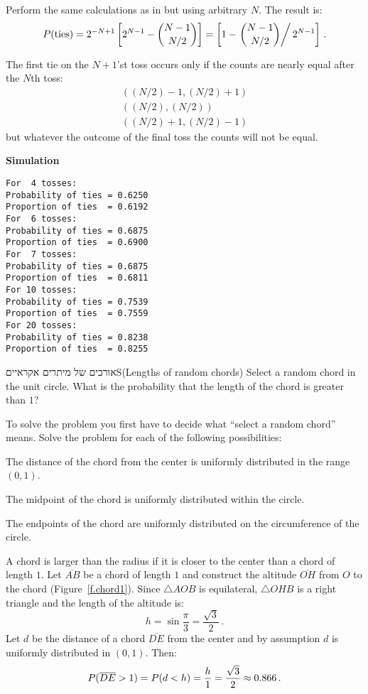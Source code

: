  Perform the same calculations as in  but using arbitrary $N$. The result is:
\[
P(\textrm{ties})=2^{-N+1}\left[2^{N-1} - \displaystyle{N-1 \choose N/2}\right]= 
\left[1 - \left.\displaystyle{N-1 \choose N/2}\right/ 2^{N-1}\right]\,.
\]

 The first tie on the $N+1$'st toss occurs only if the counts are nearly equal after the $N$th toss:
\[
\begin{array}{l}
((N/2)-1,(N/2)+1)\\((N/2),(N/2))\\((N/2)+1,(N/2)-1)
\end{array}
\]
but whatever the outcome of the final toss the counts will not be equal.

\textbf{Simulation}
\begin{verbatim}
For  4 tosses:
Probability of ties = 0.6250
Proportion of ties  = 0.6192
For  6 tosses:
Probability of ties = 0.6875
Proportion of ties  = 0.6900
For  7 tosses:
Probability of ties = 0.6875
Proportion of ties  = 0.6811
For 10 tosses:
Probability of ties = 0.7539
Proportion of ties  = 0.7559
For 20 tosses:
Probability of ties = 0.8238
Proportion of ties  = 0.8255
\end{verbatim}






\begin{prob}{אורכים של מיתרים אקראיים}{S}{(Lengths of random chords)}
Select a random chord in the unit circle. What is the probability that the length of the chord is greater than $1$?

To solve the problem you first have to decide what ``select a random chord'' means. Solve the problem for each of the following possibilities:

 The distance of the chord from the center is uniformly distributed in the range $(0,1)$.

 The midpoint of the chord is uniformly distributed within the circle.

 The endpoints of the chord are uniformly distributed on the circumference of the circle.
\end{prob}

\solution{}

 A chord is larger than the radius if it is closer to the center than a chord of length $1$. Let $\overline{AB}$ be a chord of length $1$ and construct the altitude $\overline{OH}$ from $O$ to the chord (Figure~\ref{f.chord1}). Since $\triangle AOB$ is equilateral, $\triangle OHB$ is a right triangle and the length of the altitude is:
\[
h = \sin \frac{\pi}{3} = \frac{\sqrt{3}}{2}\,.
\]
Let $d$ be the distance of a chord $\overline{DE}$ from the center and by assumption $d$ is uniformly distributed in $(0,1)$. Then:
\[
P(\overline{DE}>1)=P(d<h)=\displaystyle\frac{h}{1}=\frac{\sqrt{3}}{2} \approx 0.866\,.
\]

